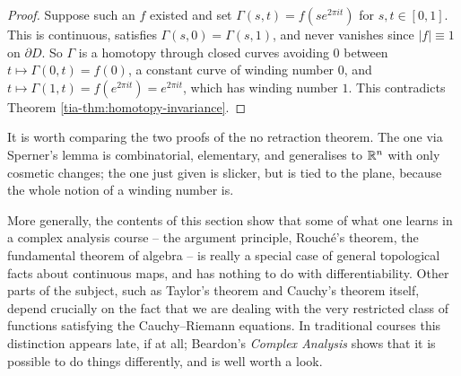 \documentclass[a4paper]{scrartcl}
\begin{document}
\begin{proof}
	Suppose such an $f$ existed and set $\Gamma(s,t) = f(se^{2\pi it})$ for $s,t\in[0,1]$. This is continuous, satisfies $\Gamma(s,0)=\Gamma(s,1)$, and never vanishes since $|f|\equiv1$ on $\partial D$. So $\Gamma$ is a homotopy through closed curves avoiding $0$ between $t\mapsto\Gamma(0,t) = f(0)$, a constant curve of winding number $0$, and $t\mapsto\Gamma(1,t)=f(e^{2\pi it}) = e^{2\pi it}$, which has winding number $1$. This contradicts Theorem \ref{tia-thm:homotopy-invariance}.
\end{proof}

It is worth comparing the two proofs of the no retraction theorem. The one via Sperner's lemma is combinatorial, elementary, and generalises to $\mathbb{R}^n$ with only cosmetic changes; the one just given is slicker, but is tied to the plane, because the whole notion of a winding number is.

More generally, the contents of this section show that some of what one learns in a complex analysis course -- the argument principle, Rouch\'e's theorem, the fundamental theorem of algebra -- is really a special case of general topological facts about continuous maps, and has nothing to do with differentiability. Other parts of the subject, such as Taylor's theorem and Cauchy's theorem itself, depend crucially on the fact that we are dealing with the very restricted class of functions satisfying the Cauchy--Riemann equations. In traditional courses this distinction appears late, if at all; Beardon's \emph{Complex Analysis} shows that it is possible to do things differently, and is well worth a look.
\end{document}
